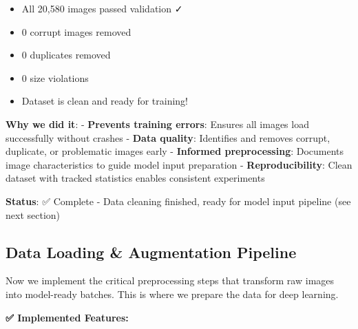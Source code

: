 \documentclass[
  letterpaper,
  DIV=11,
  numbers=noendperiod]{scrartcl}
\providecommand{\tightlist}{%
  \setlength{\itemsep}{0pt}\setlength{\parskip}{0pt}}
\begin{document}
\begin{enumerate}
  \begin{itemize}
  \tightlist
  \item
    All 20,580 images passed validation ✓
  \item
    0 corrupt images removed
  \item
    0 duplicates removed\\
  \item
    0 size violations
  \item
    Dataset is clean and ready for training!
  \end{itemize}
\end{enumerate}

\textbf{Why we did it}: - \textbf{Prevents training errors}: Ensures all
images load successfully without crashes - \textbf{Data quality}:
Identifies and removes corrupt, duplicate, or problematic images early -
\textbf{Informed preprocessing}: Documents image characteristics to
guide model input preparation - \textbf{Reproducibility}: Clean dataset
with tracked statistics enables consistent experiments

\textbf{Status}: ✅ Complete - Data cleaning finished, ready for model
input pipeline (see next section)

\subsection{Data Loading \& Augmentation
Pipeline}\label{data-loading-augmentation-pipeline}

Now we implement the critical preprocessing steps that transform raw
images into model-ready batches. This is where we prepare the data for
deep learning.

\textbf{✅ Implemented Features:}
\end{document}
